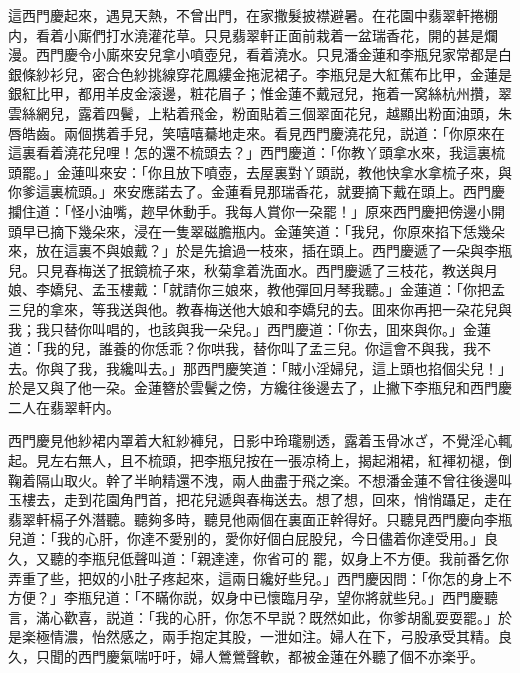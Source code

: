 這西門慶起來，遇見天熱，不曾出門，在家撒髮披襟避暑。在花園中翡翠軒捲棚内，看着小廝們打水澆灌花草。只見翡翠軒正面前栽着一盆瑞香花，開的甚是爛漫。西門慶令小廝來安兒拿小噴壺兒，看着澆水。只見潘金蓮和李瓶兒家常都是白銀條紗衫兒，密合色紗挑線穿花鳳縷金拖泥裙子。李瓶兒是大紅蕉布比甲，金蓮是銀紅比甲，都用羊皮金滚邊，粧花眉子；惟金蓮不戴冠兒，拖着一窝絲杭州攢，翠雲絲網兒，露着四鬢，上粘着飛金，粉面貼着三個翠面花兒，越顯出粉面油頭，朱唇皓齒。兩個携着手兒，笑嘻嘻驀地走來。看見西門慶澆花兒，説道：「你原來在這裏看着澆花兒哩！怎的還不梳頭去？」西門慶道：「你教丫頭拿水來，我這裏梳頭罷。」金蓮叫來安：「你且放下噴壺，去屋裏對丫頭説，教他快拿水拿梳子來，與你爹這裏梳頭。」來安應諾去了。金蓮看見那瑞香花，就要摘下戴在頭上。西門慶攔住道：「怪小油嘴，趂早休動手。我每人賞你一朶罷！」原來西門慶把傍邊小開頭早已摘下幾朵來，浸在一隻翠磁膽瓶内。金蓮笑道：「我兒，你原來掐下恁幾朵來，放在這裏不與娘戴？」於是先搶過一枝來，插在頭上。西門慶遞了一朵與李瓶兒。只見春梅送了抿鏡梳子來，秋菊拿着洗面水。西門慶遞了三枝花，教送與月娘、李嬌兒、孟玉樓戴：「就請你三娘來，教他彈回月琴我聽。」金蓮道：「你把孟三兒的拿來，等我送與他。教春梅送他大娘和李嬌兒的去。囬來你再把一朶花兒與我；我只替你叫唱的，也該與我一朵兒。」西門慶道：「你去，囬來與你。」金蓮道：「我的兒，誰養的你恁乖？你哄我，替你叫了孟三兒。你這會不與我，我不去。你與了我，我纔叫去。」那西門慶笑道：「賊小淫婦兒，這上頭也掐個尖兒！」於是又與了他一朶。金蓮簪於雲鬢之傍，方纔往後邊去了，止撇下李瓶兒和西門慶二人在翡翠軒内。

西門慶見他紗裙内罩着大紅紗褲兒，日影中玲瓏剔透，露着玉骨冰ざ，不覺淫心輒起。見左右無人，且不梳頭，把李瓶兒按在一張凉椅上，揭起湘裙，紅褌初褪，倒鞠着隔山取火。幹了半晌精還不洩，兩人曲盡于飛之楽。不想潘金蓮不曾往後邊叫玉樓去，走到花園角門首，把花兒遞與春梅送去。想了想，回來，悄悄躡足，走在翡翠軒槅子外潛聽。聽夠多時，聽見他兩個在裏面正幹得好。只聽見西門慶向李瓶兒道：「我的心肝，你達不愛别的，愛你好個白屁股兒，今日儘着你達受用。」良久，又聽的李瓶兒低聲叫道：「親達達，你省可的𢵞罷，奴身上不方便。我前番乞你弄重了些，把奴的小肚子疼起來，這兩日纔好些兒。」西門慶因問：「你怎的身上不方便？」李瓶兒道：「不瞞你説，奴身中已懷臨月孕，望你將就些兒。」西門慶聽言，滿心歡喜，説道：「我的心肝，你怎不早説？既然如此，你爹胡亂耍耍罷。」於是楽極情濃，怡然感之，兩手抱定其股，一泄如注。婦人在下，弓股承受其精。良久，只聞的西門慶氣喘吁吁，婦人鶯鶯聲軟，都被金蓮在外聽了個不亦楽乎。

